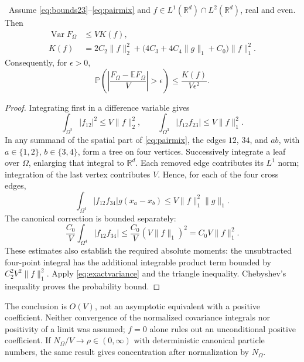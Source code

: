 \begin{theorem}\ours\ 
Assume \eqref{eq:bounds23}--\eqref{eq:pairmix} and \(f\in L^1(\mathbb R^d)\cap L^2(\mathbb R^d)\), real and even. Then
\begin{align}
 \operatorname{Var}F_\Omega&\leq V K(f),\label{eq:variancebound}\\
 K(f)&=2C_2\|f\|_2^2+
 \bigl(4C_3+4C_4\|g\|_1+C_0\bigr)\|f\|_1^2.\label{eq:K}
\end{align}
Consequently, for \(\epsilon>0\),
\[
 \mathbb P\!\left(\left|\frac{F_\Omega-\mathbb EF_\Omega}{V}\right|>\epsilon\right)
 \leq\frac{K(f)}{V\epsilon^2}.
\]
\end{theorem}
\begin{proof}
Integrating first in a difference variable gives
\[
 \int_{\Omega^2}|f_{12}|^2\leq V\|f\|_2^2,
 \qquad
 \int_{\Omega^3}|f_{12}f_{23}|\leq V\|f\|_1^2.
\]
In any summand of the spatial part of \eqref{eq:pairmix}, the edges \(12\), \(34\), and \(ab\), with \(a\in\{1,2\}\), \(b\in\{3,4\}\), form a tree on four vertices. Successively integrate a leaf over \(\Omega\), enlarging that integral to \(\mathbb R^d\). Each removed edge contributes its \(L^1\) norm; integration of the last vertex contributes \(V\). Hence, for each of the four cross edges,
\[
 \int_{\Omega^4}|f_{12}f_{34}|g(x_a-x_b)
 \leq V\|f\|_1^2\|g\|_1.
\]
The canonical correction is bounded separately:
\[
 \frac{C_0}{V}\int_{\Omega^4}|f_{12}f_{34}|
 \leq\frac{C_0}{V}(V\|f\|_1)^2
 =C_0V\|f\|_1^2.
\]
These estimates also establish the required absolute moments: the unsubtracted four-point integral has the additional integrable product term bounded by \(C_2^2V^2\|f\|_1^2\). Apply \eqref{eq:exactvariance} and the triangle inequality. Chebyshev’s inequality proves the probability bound.
\end{proof}

The conclusion is \(O(V)\), not an asymptotic equivalent with a positive coefficient. Neither convergence of the normalized covariance integrals nor positivity of a limit was assumed; \(f=0\) alone rules out an unconditional positive coefficient. If \(N_\Omega/V\to\rho\in(0,\infty)\) with deterministic canonical particle numbers, the same result gives concentration after normalization by \(N_\Omega\).

